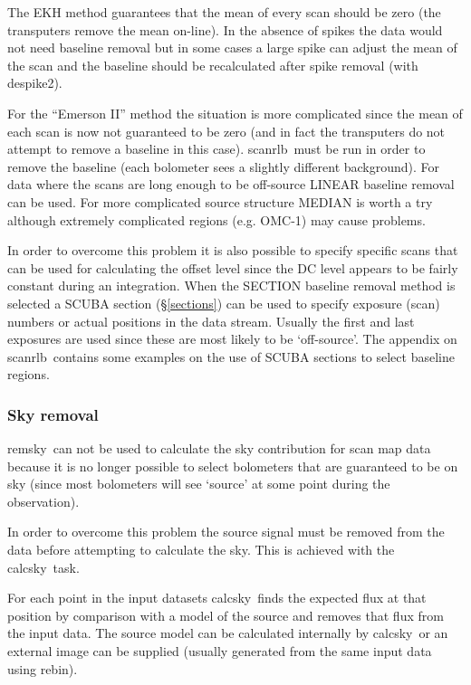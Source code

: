 \documentclass[twoside,11pt]{article}
\newcommand{\task}[1]{{\sf #1}}
\newcommand{\rebin}{\htmlref{\task{rebin}}{REBIN}}
\newcommand{\calcsky}{\htmlref{\task{calcsky}}{CALCSKY}}
\newcommand{\remsky}{\htmlref{\task{remsky}}{REMSKY}}
\newcommand{\despikeb}{\htmlref{\task{despike2}}{DESPIKE2}}
\newcommand{\scanrlb}{\htmlref{\task{scan\_rlb}}{SCAN_RLB}}
\newcommand{\htmlref}[2]{#1}
\renewcommand{\_}{\texttt{\symbol{95}}}
\begin{document}
The EKH method guarantees that the mean of every scan should be zero
(the transputers remove the mean on-line). In the absence of spikes
the data would not need baseline removal but in some cases a large spike
can adjust the mean of the scan and the baseline should be recalculated
after spike removal (with \despikeb).

For the ``Emerson II'' method the situation is more complicated
since the mean of each scan is now not guaranteed to be zero (and in
fact the transputers do not attempt to remove a baseline in this case).
\scanrlb\ must be run in order to remove the baseline (each bolometer
sees a slightly different background). For data where the scans
are long enough to be off-source LINEAR baseline removal can be used.
For more complicated source structure MEDIAN is worth a try although
extremely complicated regions (e.g. OMC-1) may cause problems. 

In order to overcome this problem it is also possible to specify specific
scans that can be used for calculating the offset level since the DC level
appears to be fairly constant during an integration.  When the SECTION
baseline removal method is selected a SCUBA section (\S\ref{sections}) can be
used to specify exposure (scan) numbers or actual positions in the data
stream. Usually the first and last exposures are used since these are most
likely to be `off-source'. The appendix on \scanrlb\ contains some examples on
the use of SCUBA sections to select baseline regions.

\subsubsection{Sky removal\label{scan:sky}}

\remsky\ can not be used to calculate the sky contribution for scan
map data because it is no longer possible to select bolometers that
are guaranteed to be on sky (since most bolometers will see `source'
at some point during the observation).

In order to overcome this problem the source signal must be removed
from the data before attempting to calculate the sky. This is achieved
with the \calcsky\ task.

For each point in the input datasets \calcsky\ finds the expected flux
at that position by comparison with a model of the source and removes
that flux from the input data. The source model can be calculated internally
by \calcsky\ or an external image can be supplied (usually generated from
the same input data using \rebin). 
\end{document}
